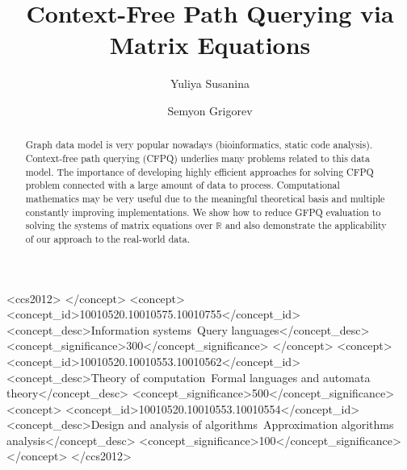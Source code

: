 \documentclass[sigconf]{acmart}
\begin{document}
\title{Context-Free Path Querying via Matrix Equations}

\author{Yuliya Susanina}

\author{Semyon Grigorev}



\begin{abstract}
  Graph data model is very popular nowadays (bioinformatics, static code analysis). 
  Context-free path querying (CFPQ) underlies many problems related to this data model.
  The importance of developing highly efficient approaches for solving CFPQ problem connected with a large amount of data to process.
  Computational mathematics may be very useful due to the meaningful theoretical basis and multiple constantly improving implementations.
  We show how to reduce GFPQ evaluation to solving the systems of matrix equations over $\mathbb{R}$ and also demonstrate the applicability of our approach to the real-world data.
\end{abstract}

\begin{CCSXML}
<ccs2012>
 </concept>
 <concept>
  <concept_id>10010520.10010575.10010755</concept_id>
  <concept_desc>Information systems~Query languages</concept_desc>
  <concept_significance>300</concept_significance>
 </concept>
 <concept>
  <concept_id>10010520.10010553.10010562</concept_id>
  <concept_desc>Theory of computation~Formal languages and automata theory</concept_desc>
  <concept_significance>500</concept_significance>
 <concept>
  <concept_id>10010520.10010553.10010554</concept_id>
  <concept_desc>Design and analysis of algorithms~Approximation algorithms analysis</concept_desc>
  <concept_significance>100</concept_significance>
 </concept>
</ccs2012>
\end{CCSXML}
\end{document}
